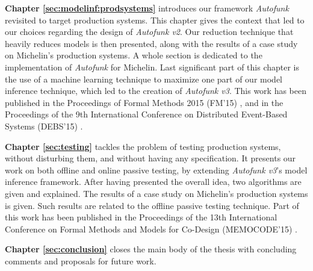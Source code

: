 \textbf{Chapter \ref{sec:modelinf:prodsystems}} introduces our
framework \textit{Autofunk} revisited to target production
systems. This chapter gives the context that led to our choices
regarding the design of \textit{Autofunk v2}. Our reduction
technique that heavily reduces models is then presented, along
with the results of a case study on Michelin's production
systems. A whole section is dedicated to the implementation of
\textit{Autofunk} for Michelin. Last significant part of this
chapter is the use of a machine learning technique to maximize
one part of our model inference technique, which led to the
creation of \emph{Autofunk v3}. This work has been published in
the Proceedings of Formal Methods 2015 (FM'15)
\cite{DBLP:conf/fm/DurandS15}, and in the Proceedings of the 9th
International Conference on Distributed Event-Based Systems
(DEBS'15) \cite{DBLP:conf/debs/SalvaD15}.

\textbf{Chapter \ref{sec:testing}} tackles the problem of testing
production systems, without disturbing them, and without having
any specification. It presents our work on both offline and
online passive testing, by extending \textit{Autofunk v3}'s model
inference framework. After having presented the overall idea, two
algorithms are given and explained. The results of a case study
on Michelin's production systems is given. Such results are
related to the offline passive testing technique. Part of this
work has been published in the Proceedings of the 13th
International Conference on Formal Methods and Models for
Co-Design (MEMOCODE'15) \cite{7340480}.

\textbf{Chapter \ref{sec:conclusion}} closes the main body of the
thesis with concluding comments and proposals for future work.

\cleardoublepage
\blankpage

